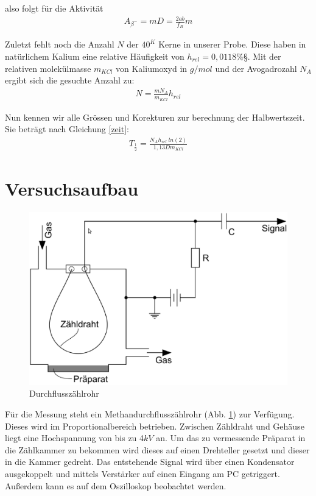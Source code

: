 \documentclass[12pt]{article}
\begin{document}
also folgt für die Aktivität
\begin{align}
 A_{\beta^-}=m D=\frac{2ab}{f_B}m
\end{align}

Zuletzt fehlt noch die Anzahl $N$ der ${40}^K$ Kerne in unserer Probe. Diese haben in natürlichem Kalium eine relative Häufigkeit von $h_{rel}=0,0118\%$§. Mit der relativen molekülmasse $m_{KCl}$ von Kaliumoxyd in $g/mol$ und der Avogadrozahl $N_A$ ergibt sich die gesuchte Anzahl zu:
\begin{align}
 N=\frac{m N_A}{m_{KCl}} h_{rel}
\end{align}

Nun kennen wir alle Grössen und Korekturen zur berechnung der Halbwertszeit. Sie beträgt nach Gleichung \ref{zeit}:
\begin{align}
 T_{\frac{1}{2}} = \frac{N_A h_{rel} ~ ln(2)}{1,13 D m_{KCl}}
\end{align}
\newpage

\section{Versuchsaufbau}

\begin{figure}[H]  
\centering
\includegraphics[width=0.9\linewidth]{pictures/aufbau.eps}
\caption{Durchflusszählrohr}
\label{aufbau}
\end{figure}

Für die Messung steht ein Methandurchflusszählrohr (Abb. \ref{aufbau}) zur Verfügung.
Dieses wird im Proportionalbereich betrieben. Zwischen Zähldraht und Gehäuse liegt eine Hochspannung von bis zu 4$kV$ an.
Um das zu vermessende Präparat in die Zählkammer zu bekommen wird dieses auf einen Drehteller gesetzt und dieser in die Kammer gedreht.
Das entstehende Signal wird über einen Kondensator ausgekoppelt und mittels Verstärker auf einen Eingang am PC getriggert. Außerdem kann
es auf dem Oszilloskop beobachtet werden.
\end{document}
